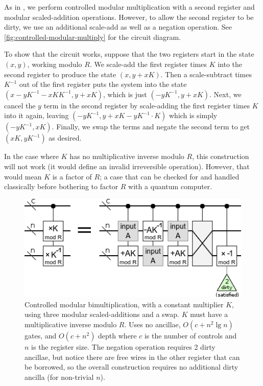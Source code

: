\documentclass[twocolumn,longbibliography]{quantumarticle}
\begin{document}
As in \cite{beauregard2003}, we perform controlled modular multiplication with a second register and modular scaled-addition operations.
However, to allow the second register to be dirty, we use an additional scale-add as well as a negation operation.
See \autoref{fig:controlled-modular-multiply} for the circuit diagram.

To show that the circuit works, suppose that the two registers start in the state $(x, y)$, working modulo $R$.
We scale-add the first register times $K$ into the second register to produce the state $(x, y+xK)$.
Then a scale-subtract times $K^{-1}$ out of the first register puts the system into the state $(x-yK^{-1}-xKK^{-1}, y+xK)$, which is just $(-yK^{-1}, y+xK)$.
Next, we cancel the $y$ term in the second register by scale-adding the first register times $K$ into it again, leaving $(-yK^{-1}, y+xK-yK^{-1} \cdot K)$ which is simply $(-yK^{-1}, xK)$.
Finally, we swap the terms and negate the second term to get $(xK, yK^{-1})$ as desired.

In the case where $K$ has no multiplicative inverse modulo $R$, this construction will not work (it would define an invalid irreversible operation).
However, that would mean $K$ is a factor of $R$; a case that can be checked for and handled classically before bothering to factor $R$ with a quantum computer.

\begin{figure}
  \centering
  \includegraphics[width=\linewidth]{assets/controlled-modular-multiply.png}
  \caption{
    Controlled modular bimultiplication, with a constant multiplier $K$, using three modular scaled-additions and a swap.
    $K$ must have a multiplicative inverse modulo $R$.
    Uses no ancillae, $O(c + n^2 \lg n)$ gates, and $O(c + n^2)$ depth where $c$ is the number of controls and $n$ is the register size.
    The negation operation requires 2 dirty ancillae, but notice there are free wires in the other register that can be borrowed, so the overall construction requires no additional dirty ancilla (for non-trivial $n$).
  }
  \label{fig:controlled-modular-multiply}
\end{figure}
\end{document}
